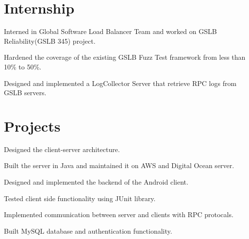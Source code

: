 \documentclass[]{deedy-resume-openfont}
\begin{document}
\hfill
\begin{minipage}[t]{0.68\textwidth} 



\section{Internship}
\vspace{\topsep} %
\begin{tightemize}
	\item Interned in Global Software Load Balancer Team and worked on GSLB Reliability(GSLB 345) project.
	\item Hardened the coverage of the existing GSLB Fuzz Test framework from less than 10\% to 50\%.
	\item Designed and implemented a LogCollector Server that retrieve RPC logs from GSLB servers.
\end{tightemize}
\sectionsep

\section{Projects}

\begin{tightemize}
	\item Designed the client-server architecture.
	\item Built the server in Java and maintained it on AWS and Digital Ocean server.
	\item Designed and implemented the backend of the Android client.
	\item Tested client side functionality using JUnit library.
	\item Implemented communication between server and clients with RPC protocals.
	\item Built MySQL database and authentication functionality.
\end{tightemize}
\sectionsep



\end{minipage}
\end{document}
